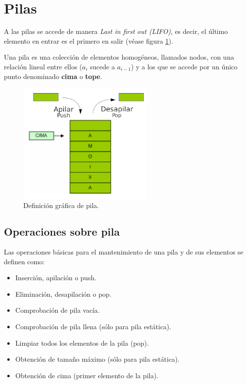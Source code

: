 \documentclass[a4paper, 11pt, titlepage]{article}
\begin{document}
\section{Pilas} 

    A las pilas se accede de manera \textit{Last in first out (LIFO)}, es decir, el último
    elemento en entrar es el primero en salir (véase figura \ref{pila01}).

    Una pila es una colección de elementos homogéneos, llamados nodos, con una relación lineal 
    entre ellos ($a_i$ sucede a $a_{i-1}$) y a los que se accede por un único punto denominado 
    \textbf{cima} o \textbf{tope}.

    \begin{figure}[htp]
        \centering
        \includegraphics[width=0.6\textwidth]{resources/pila01.png}
        \caption{Definición gráfica de pila.}
        \label{pila01}
    \end{figure}

    \subsection{Operaciones sobre pila}
    
        Las operaciones básicas para el mantenimiento de una pila y de sus elementos se definen
        como:

        \begin{itemize}
            \item Inserción, apilación o push.
            \item Eliminación, desapilación o pop.
            \item Comprobación de pila vacía.
            \item Comprobación de pila llena (sólo para pila estática).
            \item Limpiar todos los elementos de la pila (pop).
            \item Obtención de tamaño máximo (sólo para pila estática).
            \item Obtención de cima (primer elemento de la pila).
        \end{itemize}
\end{document}
